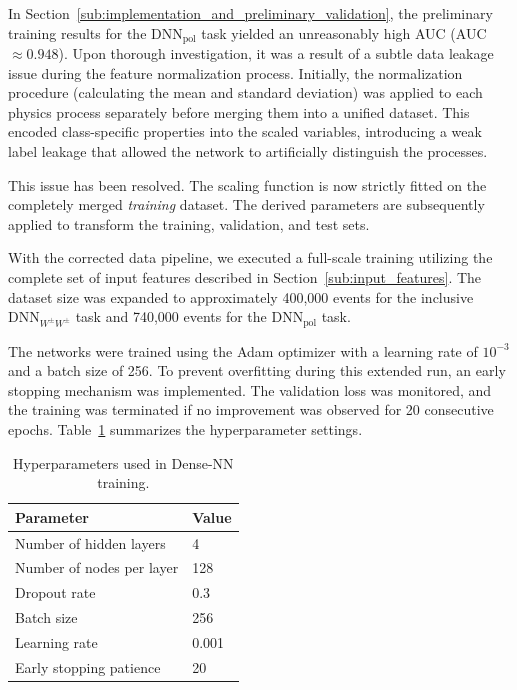 \documentclass[12pt]{article}
\begin{document}
        In Section~\ref{sub:implementation_and_preliminary_validation}, the preliminary training results for the $\text{DNN}_{\text{pol}}$ task yielded an unreasonably high AUC (AUC $\approx 0.948$). Upon thorough investigation, it was a result of a subtle data leakage issue during the feature normalization process. Initially, the normalization procedure (calculating the mean and standard deviation) was applied to each physics process separately before merging them into a unified dataset. This encoded class-specific properties into the scaled variables, introducing a weak label leakage that allowed the network to artificially distinguish the processes.
        
        This issue has been resolved. The scaling function is now strictly fitted on the completely merged \textit{training} dataset. The derived parameters are subsequently applied to transform the training, validation, and test sets.

        With the corrected data pipeline, we executed a full-scale training utilizing the complete set of input features described in Section~\ref{sub:input_features}. The dataset size was expanded to approximately 400,000 events for the inclusive $\text{DNN}_{W^{\pm}W^{\pm}}$ task and 740,000 events for the $\text{DNN}_{\text{pol}}$ task. 

        The networks were trained using the Adam optimizer with a learning rate of $10^{-3}$ and a batch size of 256. To prevent overfitting during this extended run, an early stopping mechanism was implemented. The validation loss was monitored, and the training was terminated if no improvement was observed for 20 consecutive epochs. Table~\ref{tab:dense_nn_hyperparameter} summarizes the hyperparameter settings.

        \begin{table}[htbp]
            \centering
            \caption{Hyperparameters used in Dense-NN training.}
            \label{tab:dense_nn_hyperparameter}
            \begin{tabular}{l|l}
            \hline\hline
            Parameter                   & Value \\ \hline
            Number of hidden layers     & 4     \\
            Number of nodes per layer   & 128   \\
            Dropout rate                & 0.3   \\
            Batch size                  & 256  \\
            Learning rate               & 0.001 \\
            Early stopping patience     & 20    \\
            \hline\hline
            \end{tabular}
        \end{table}
\end{document}
